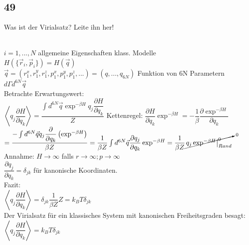 \subsection{49}
\begin{myfrag}
Was ist der Virialsatz? Leite ihn her!
\end{myfrag} \quad \\
$i= 1,...,N $ \qquad allgemeine Eigenschaften klass. Modelle \\[1.5ex]
$H(\{\vec{r}_i,\vec{p}_i\})=H(\vec{q})$\\[1ex]
$\vec{q}=(r_1^x,r_1^y,r_1^z, p_1^x,p_1^y,p_1^z,...)=(q,...,q_{6N})$ Funktion von 6N Parametern $d\Gamma d^{6N}\vec{q}$ \\[1.5ex]
Betrachte Erwartungswert: \\[1.5ex]
$\left\langle q_j \dfrac{\partial H}{\partial q_k} \right\rangle = \dfrac{\int d^{6N} \vec{q} \exp ^{-\beta H} q_j \dfrac{\partial H}{\partial q_k}}{Z}$ \qquad Kettenregel: $\dfrac{\partial H}{\partial q_k} \exp ^{-\beta H} = -\dfrac{1}{\beta } \dfrac{\partial \exp ^{ -\beta H}}{\partial q_k}$ \\[1ex]
$= \dfrac{-\int d^{6N} \vec{q} q_j \dfrac{\partial}{\partial q_k}\left( \exp ^{-\beta H} \right)}{\beta Z} = \dfrac{1}{\beta Z} \int d^{6N} \vec{q} \dfrac{\partial q_j}{\partial q_k} \exp ^{-\beta H} = \dfrac{1}{\beta Z} \cancelto{0}{\left. q_j \exp^{-\beta H}\right| _{Rand} ^0} $ \\[1.5ex]
Annahme: $ H \rightarrow \infty $ falls $r\rightarrow \infty; p\rightarrow \infty$ \\[1ex]
$\dfrac{\partial q_j}{\partial q_k} = \delta_{jk}$ für kanonische Koordinaten. \\[1.5ex]
Fazit: \\[1.5ex]
$\left\langle q_j \dfrac{\partial H}{\partial q_k}\right\rangle = \delta_{jk} \dfrac{1}{\beta Z}Z = k_BT\delta_{jk}$ \\[1.5ex]
Der Virialsatz für ein klassisches System mit kanonischen Freiheitsgraden besagt:
\\[1.5ex]
$\left\langle q_j \dfrac{\partial H}{\partial q_k}\right\rangle = k_BT\delta_{jk}$